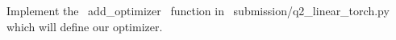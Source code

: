 \item {}
Implement the ~add_optimizer~ function in ~submission/q2_linear_torch.py~ which will define our optimizer.